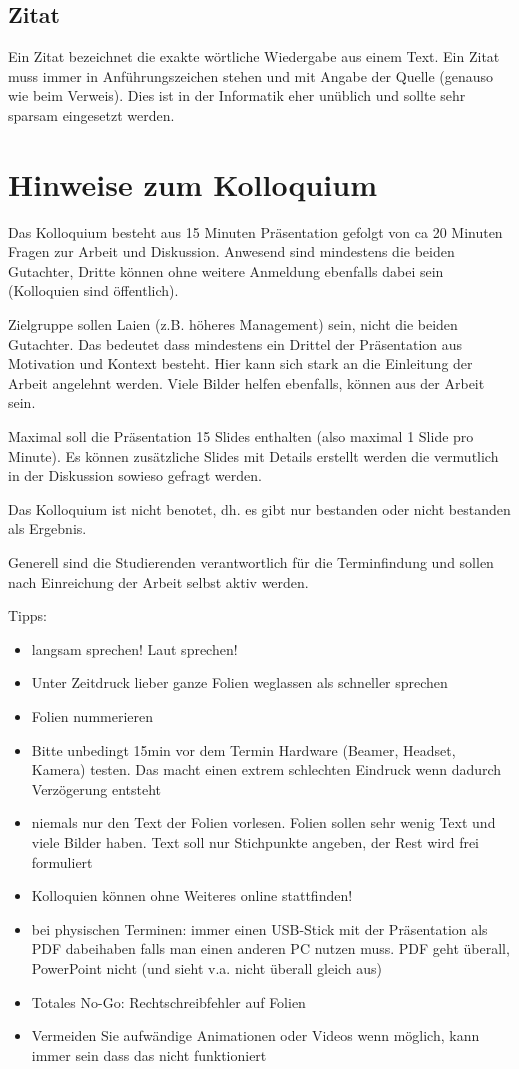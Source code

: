 \documentclass[12pt,oneside]{article}
\begin{document}
\subsection{Zitat}
Ein Zitat bezeichnet die exakte wörtliche Wiedergabe aus einem Text. Ein Zitat muss immer in
Anführungszeichen stehen und mit Angabe der Quelle (genauso wie beim Verweis). Dies ist in der Informatik eher unüblich und sollte sehr sparsam eingesetzt werden.

\section{Hinweise zum Kolloquium}
Das Kolloquium besteht aus 15 Minuten Präsentation gefolgt von ca 20 Minuten Fragen zur Arbeit und Diskussion. Anwesend sind mindestens die beiden Gutachter, Dritte können ohne weitere Anmeldung ebenfalls dabei sein (Kolloquien sind öffentlich). 

Zielgruppe sollen Laien (z.B. höheres Management) sein, nicht die beiden Gutachter. Das bedeutet dass mindestens ein Drittel der Präsentation aus Motivation und Kontext besteht. Hier kann sich stark an die Einleitung der Arbeit angelehnt werden. Viele Bilder helfen ebenfalls, können aus der Arbeit sein.

Maximal soll die Präsentation 15 Slides enthalten (also maximal 1 Slide pro Minute). Es können zusätzliche Slides mit Details erstellt werden die vermutlich in der Diskussion sowieso gefragt werden.

Das Kolloquium ist nicht benotet, dh. es gibt nur bestanden oder nicht bestanden als Ergebnis. 

Generell sind die Studierenden verantwortlich für die Terminfindung und sollen nach Einreichung der Arbeit selbst aktiv werden. 

Tipps:
\begin{itemize}
    \item langsam sprechen! Laut sprechen!
    \item Unter Zeitdruck lieber ganze Folien weglassen als schneller sprechen
    \item Folien nummerieren
    \item Bitte unbedingt 15min vor dem Termin Hardware (Beamer, Headset, Kamera) testen. Das macht einen extrem schlechten Eindruck wenn dadurch Verzögerung entsteht
    \item niemals nur den Text der Folien vorlesen. Folien sollen sehr wenig Text und viele Bilder haben. Text soll nur Stichpunkte angeben, der Rest wird frei formuliert
    \item Kolloquien können ohne Weiteres online stattfinden!
    \item bei physischen Terminen: immer einen USB-Stick mit der Präsentation als PDF dabeihaben falls man einen anderen PC nutzen muss. PDF geht überall, PowerPoint nicht (und sieht v.a. nicht überall gleich aus)
    \item Totales No-Go: Rechtschreibfehler auf Folien
    \item Vermeiden Sie aufwändige Animationen oder Videos wenn möglich, kann immer sein dass das nicht funktioniert
\end{itemize}


\end{document}
